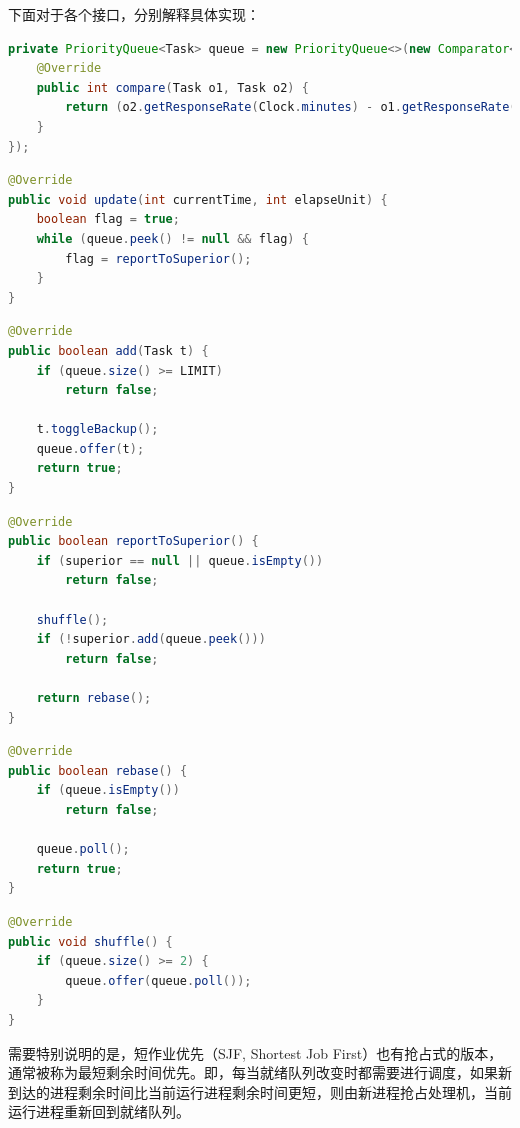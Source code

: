 \documentclass[12pt, a4paper, UTF8]{ctexart}
\begin{document}
下面对于各个接口，分别解释具体实现：

\begin{lstlisting}[language={java},caption={收容队列（基于响应比的优先队列）}]
private PriorityQueue<Task> queue = new PriorityQueue<>(new Comparator<Task>() {
    @Override
    public int compare(Task o1, Task o2) {
        return (o2.getResponseRate(Clock.minutes) - o1.getResponseRate(Clock.minutes) > 0) ? (1) : (-1);
    }
});
\end{lstlisting}

\begin{lstlisting}[language={java},caption={调度方式（向上提交），调度时机（时间流逝）}]
@Override
public void update(int currentTime, int elapseUnit) {
    boolean flag = true;
    while (queue.peek() != null && flag) {
        flag = reportToSuperior();
    }
}
\end{lstlisting}

\begin{lstlisting}[language={java},caption={添加作业（收容状态）}]
@Override
public boolean add(Task t) {
    if (queue.size() >= LIMIT)
        return false;

    t.toggleBackup();
    queue.offer(t);
    return true;
}
\end{lstlisting}

\begin{lstlisting}[language={java},caption={模拟为作业创建进程，装填进入内存}]
@Override
public boolean reportToSuperior() {
    if (superior == null || queue.isEmpty())
        return false;

    shuffle();
    if (!superior.add(queue.peek()))
        return false;

    return rebase();
}
\end{lstlisting}

\begin{lstlisting}[language={java},caption={在本层队列中移除任务}]
@Override
public boolean rebase() {
    if (queue.isEmpty())
        return false;

    queue.poll();
    return true;
}
\end{lstlisting}

\begin{lstlisting}[language={java},caption={响应比动态变化，刷新队列顺序}]
@Override
public void shuffle() {
    if (queue.size() >= 2) {
        queue.offer(queue.poll());
    }
}
\end{lstlisting}

需要特别说明的是，短作业优先（SJF, Shortest Job First）也有抢占式的版本，通常被称为最短剩余时间优先。即，每当就绪队列改变时都需要进行调度，如果新到达的进程剩余时间比当前运行进程剩余时间更短，则由新进程抢占处理机，当前运行进程重新回到就绪队列。
\end{document}
